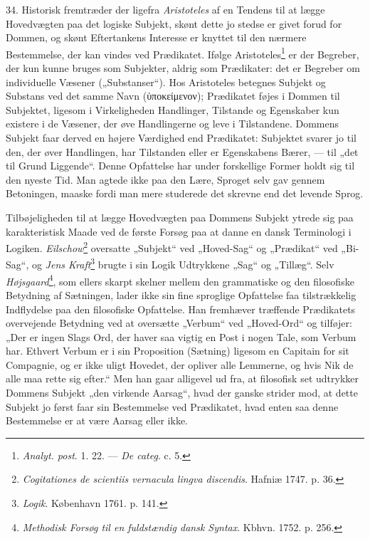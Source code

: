 \documentclass[12pt,a4paper]{book}
\newcommand{\apage}[1]{\marginnote{\footnotesize\textit{[#1]}}}
\begin{document}
34. Historisk fremtræder der ligefra \emph{Aristoteles} af en Tendens
til at lægge Hovedvægten paa det logiske Subjekt, skønt dette jo stedse
er givet forud for Dommen, og skønt Eftertankens Interesse er knyttet
til den nærmere Bestemmelse, der kan vindes ved Prædikatet. Ifølge
Aristoteles\footnote{\emph{Analyt. post}. 1. 22. --- \emph{De categ}. c.
5.} er der Begreber, der kun kunne bruges som Subjekter, aldrig som
Prædikater: det er Begreber om individuelle Væsener („Substanser“). Hos
Aristoteles betegnes Subjekt og Substans ved det samme Navn
(ὑποκείμενον); Prædikatet føjes i Dommen til Subjektet, ligesom i
Virkeligheden Handlinger, Tilstande og Egenskaber kun existere i de
Væsener, der øve Handlingerne og leve i Tilstandene. Dommens Subjekt
faar derved en højere Værdighed end Prædikatet: Subjektet svarer jo til
den, der øver Handlingen, har Tilstanden eller er Egenskabens Bærer, ---
til „det til Grund Liggende“. Denne Opfattelse har under forskellige
Former holdt sig til den nyeste Tid. Man agtede ikke paa den Lære,
Sproget selv gav gennem Betoningen, maaske fordi man mere studerede det
skrevne end det levende Sprog.

Tilbøjeligheden til at lægge Hovedvægten paa Dommens Subjekt ytrede sig
paa karakteristisk Maade ved de første Forsøg paa at danne en dansk
Terminologi i Logiken. \emph{Eilschow}\footnote{\emph{Cogitationes de
scientiis vernacula lingva discendis}. Hafniæ 1747. p. 36.} oversatte
„Subjekt“ ved „Hoved-Sag“ og „Prædikat“ ved „Bi-Sag“, og \emph{Jens
Kraft}\footnote{\emph{Logik}. København 1761. p. 141.} brugte i sin
Logik Udtrykkene „Sag“ og „Tillæg“. Selv \emph{Højsgaard}\footnote{\emph{Methodisk
Forsøg til en fuldstændig dansk Syntax}. Kbhvn. 1752. p. 256.}, som
ellers skarpt skelner mellem den grammatiske og den filosofiske
Betydning af Sætningen, lader ikke sin fine sproglige Opfattelse faa
tilstrækkelig Indflydelse paa den filosofiske \apage{97} Opfattelse. Han fremhæver
træffende Prædikatets overvejende Betydning ved at oversætte „Verbum“
ved „Hoved-Ord“ og tilføjer: „Der er ingen Slags Ord, der haver saa
vigtig en Post i nogen Tale, som Verbum har. Ethvert Verbum er i sin
Proposition (Sætning) ligesom en Capitain for sit Compagnie, og er ikke
uligt Hovedet, der opliver alle Lemmerne, og hvis Nik de alle maa rette
sig efter.“ Men han gaar alligevel ud fra, at filosofisk set udtrykker
Dommens Subjekt „den virkende Aarsag“, hvad der ganske strider mod, at
dette Subjekt jo først faar sin Bestemmelse ved Prædikatet, hvad enten
saa denne Bestemmelse er at være Aarsag eller ikke.
\end{document}
